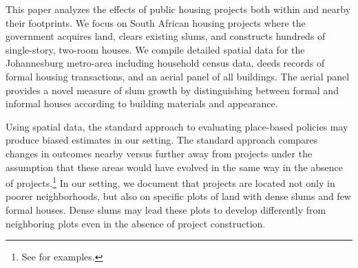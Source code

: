 \documentclass[12pt]{article}
\begin{document}







This paper analyzes the effects of public housing projects both within and nearby their footprints.  We focus on South African housing projects where the government acquires land, clears existing slums, and constructs hundreds of single-story, two-room houses.  We compile detailed spatial data for the Johannesburg metro-area including household census data, deeds records of formal housing transactions, and an aerial panel of all buildings.  The aerial panel provides a novel measure of slum growth by distinguishing between formal and informal houses according to building materials and appearance.  


Using spatial data, the standard approach to evaluating place-based policies may produce biased estimates in our setting.  The standard approach compares changes in outcomes nearby versus further away from projects under the assumption that these areas would have evolved in the same way in the absence of projects.\footnote{See \cite{diamond2016wants,rossi2010housing,hornbeck2017creative} for examples.}  In our setting, we document that projects are located not only in poorer neighborhoods, but also on specific plots of land with dense slums and few formal houses.  Dense slums may lead these plots to develop differently from neighboring plots even in the absence of project construction.
\end{document}
